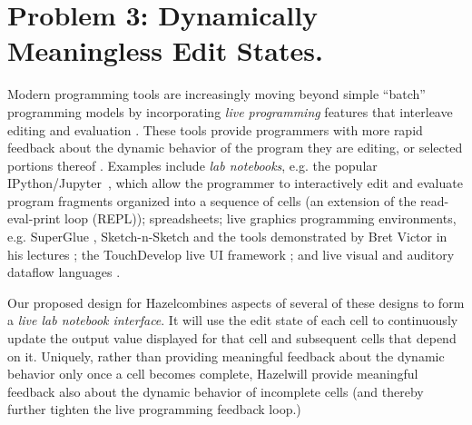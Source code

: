 \documentclass[letterpaper,USenglish]{lipics-v2016}
\newcommand{\Hazel}[0]{\textsf{Hazel}}
\newcommand{\HazelEnv}[0]{\Hazel}
\begin{document}
\section{Problem 3: Dynamically Meaningless Edit States.} Modern programming
tools are increasingly moving beyond simple ``batch'' programming models by
incorporating \emph{live programming} features that interleave editing and
evaluation \cite{DBLP:conf/icse/Tanimoto13,DBLP:journals/vlc/Tanimoto90,McDirmid:2007:LUL:1297105.1297073}. These tools provide programmers with more rapid feedback about the
dynamic behavior of the program they are editing, or selected portions thereof \cite{McDirmid:2013:ULP:2509578.2509585}. Examples include \emph{lab notebooks},
e.g. the popular IPython/Jupyter~\cite{Perez:2007:ISI:1251563.1251831}, which allow the
programmer to interactively edit and evaluate program fragments organized into a
sequence of cells (an extension of the read-eval-print loop (REPL)); spreadsheets; {live graphics programming environments}, e.g. SuperGlue \cite{McDirmid:2007:LUL:1297105.1297073}, Sketch-n-Sketch \cite{DBLP:conf/pldi/ChughHSA16,DBLP:conf/icse/Chugh25} and the tools demonstrated by Bret Victor in his lectures \cite{victor2012inventing}; the TouchDevelop live UI framework \cite{burckhardt2013s}; and live visual and auditory dataflow languages \cite{DBLP:conf/vl/BurnettAW98}. 

Our proposed design for \HazelEnv combines aspects of several of these designs to form a \emph{live lab notebook interface}. 
It will use the edit state of each cell to continuously update the output
value displayed for that cell and subsequent cells that depend on
it. Uniquely, rather than providing meaningful feedback about the dynamic
behavior only once a cell becomes complete, \HazelEnv will provide meaningful feedback also
about the dynamic behavior of incomplete cells (and thereby further tighten the live programming 
feedback loop.)
\end{document}
